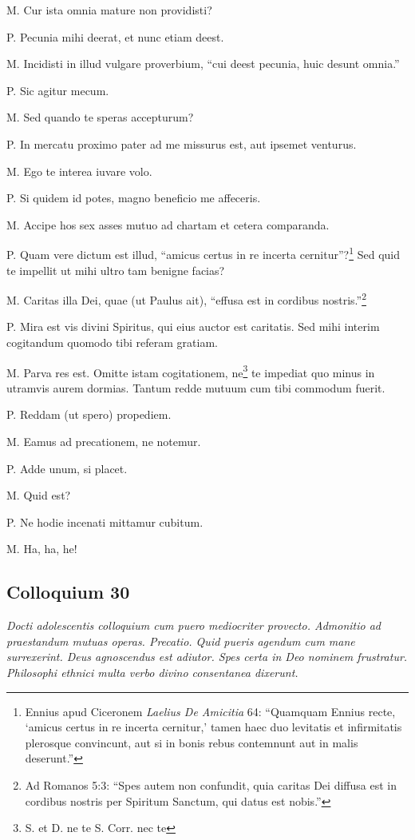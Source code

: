 \documentclass{article}
\begin{document}
M. Cur ista omnia mature non providisti?

P. Pecunia mihi deerat, et nunc etiam deest. 

M. Incidisti in illud vulgare proverbium, ``cui deest pecunia, huic desunt omnia.''

P. Sic agitur mecum.

M. Sed quando te speras accepturum?

P. In mercatu proximo pater ad me missurus est, aut ipsemet venturus. 

M. Ego te interea iuvare volo. 

P. Si quidem id potes, magno beneficio me affeceris. 

M. Accipe hos sex asses mutuo ad chartam et cetera comparanda. 

P. Quam vere dictum est illud, ``amicus certus in re incerta cernitur''?\footnote{Ennius apud Ciceronem \emph{Laelius De Amicitia} 64: ``Quamquam Ennius recte, `amicus certus in re incerta cernitur,' tamen haec duo levitatis et infirmitatis plerosque convincunt, aut si in bonis rebus contemnunt aut in malis deserunt.''} Sed quid te impellit ut mihi ultro tam benigne facias?

M. Caritas illa Dei, quae (ut Paulus ait), ``effusa est in cordibus nostris.''\footnote{Ad Romanos 5:3: ``Spes autem non confundit, quia caritas Dei diffusa est in cordibus nostris per Spiritum Sanctum, qui datus est nobis.''}

P. Mira est vis divini Spiritus, qui eius auctor est caritatis. Sed mihi interim cogitandum quomodo tibi referam gratiam. 

M. Parva res est. Omitte istam cogitationem, ne\footnote{S. et D. ne te S. Corr. nec te} te impediat quo minus in utramvis aurem dormias. Tantum redde mutuum cum tibi commodum fuerit. 

P. Reddam (ut spero) propediem.

M. Eamus ad precationem, ne notemur. 

P. Adde unum, si placet. 

M. Quid est?

P. Ne hodie incenati mittamur cubitum. 

M. Ha, ha, he!

\subsection{Colloquium 30}
\emph{Docti adolescentis colloquium cum puero mediocriter provecto. Admonitio ad praestandum mutuas operas. Precatio. Quid pueris agendum cum mane surrexerint. Deus agnoscendus est adiutor. Spes certa in Deo nominem frustratur. Philosophi ethnici multa verbo divino consentanea dixerunt.}
\end{document}
